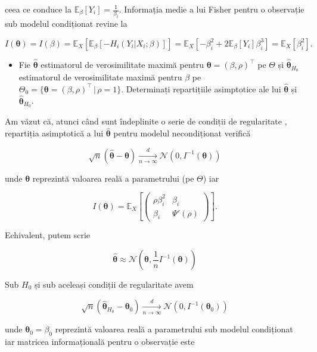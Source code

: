 \documentclass[]{article}
\newenvironment{frshaded*}{%
  \def\FrameCommand{\fboxrule=\FrameRule\fboxsep=\FrameSep \fcolorbox{framecolor}{shadecolor1}}%
  \MakeFramed {\advance\hsize-\width \FrameRestore}}%
{\endMakeFramed}
\newenvironment{rmdblock}[1]
  {\begin{frshaded*}
  \begin{itemize}
  \renewcommand{\labelitemi}{
    \raisebox{-.7\height}[0pt][0pt]{
      {\setkeys{Gin}{width=2em,keepaspectratio}\texttt{[image: images/icons/\#1]}}
    }
  }
  \item
  }
  {
  \end{itemize}
  \end{frshaded*}
  }
\newenvironment{rmdexercise}
  {\begin{rmdblock}{exercise}}
  {\end{rmdblock}}
\begin{document}
ceea ce conduce la \(\mathbb{E}_{\beta}[Y_i] = \frac{1}{\beta_i}\).
Informația medie a lui Fisher pentru o observație sub modelul
condiționat revine la

\[
I(\boldsymbol{\theta}) = I(\beta) = \mathbb{E}_{X}[\mathbb{E}_{\beta}[-H_i(Y_i|X_i;\beta)]] = \mathbb{E}_{X}[-\beta_i^2 + 2\mathbb{E}_{\beta}[Y_i]\beta_i^3] = \mathbb{E}_{X}[\beta_i^2].
\]

\begin{rmdexercise}
Fie \(\hat{\boldsymbol{\theta}}\) estimatorul de verosimilitate maximă
pentru \(\boldsymbol{\theta} = (\beta, \rho)^\intercal\) pe \(\Theta\)
și \(\hat{\boldsymbol{\theta}}_{H_0}\) estimatorul de verosimilitate
maximă pentru \(\beta\) pe
\(\Theta_0 = \{\boldsymbol{\theta} = (\beta, \rho)^\intercal\,|\,\rho = 1\}\).
Determinați repartițiile asimptotice ale lui
\(\hat{\boldsymbol{\theta}}\) și \(\hat{\boldsymbol{\theta}}_{H_0}\).
\end{rmdexercise}

Am văzut că, atunci când sunt îndeplinite o serie de condiții de
regularitate \citep[Capitolul 14]{Greene2011}, repartiția asimptotică a
lui \(\hat{\boldsymbol{\theta}}\) pentru modelul necondiționat verifică

\[
\sqrt{n}\left(\hat{\boldsymbol{\theta}} - \boldsymbol{\theta}\right) \underset{n\to\infty}{\overset{d}{\longrightarrow}} \mathcal{N}\left(0, I^{-1}(\boldsymbol{\theta})\right)
\]

unde \(\boldsymbol{\theta}\) reprezintă valoarea reală a parametrului
(pe \(\Theta\)) iar

\[
  I(\boldsymbol{\theta}) = \mathbb{E}_{X}\left[\begin{pmatrix}
    \rho\beta_i^2  & \beta_i\\ 
    \beta_i & \Psi'(\rho)
  \end{pmatrix}\right].
\]

Echivalent, putem scrie

\[
\hat{\boldsymbol{\theta}}\approx \mathcal{N}\left(\boldsymbol{\theta}, \frac{1}{n}I^{-1}(\boldsymbol{\theta})\right)
\]

Sub \(H_0\) și sub aceleași condiții de regularitate avem

\[
\sqrt{n}\left(\hat{\boldsymbol{\theta}}_{H_0} - \boldsymbol{\theta}_0\right) \underset{n\to\infty}{\overset{d}{\longrightarrow}} \mathcal{N}\left(0, I^{-1}(\boldsymbol{\theta}_0)\right)
\]

unde \(\boldsymbol{\theta}_0 = \beta_0\) reprezintă valoarea reală a
parametrului sub modelul condiționat iar matricea informațională pentru
o observație este
\end{document}
